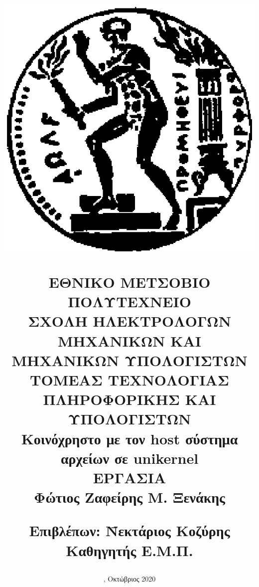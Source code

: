 \documentclass[12pt, a4paper, notitlepage]{report}
\newcommand{\en}[1]{\foreignlanguage{english}{#1}}
\newcommand{\host}{\en{host}}
\begin{document}
\title{
	\vspace*{-8ex}
	\begin{center}
		\includegraphics[scale=0.4]{pyrforos.eps}
	\end{center}
	\Large{Ε}\large{ΘΝΙΚΟ}
	\Large{Μ}\large{ΕΤΣΟΒΙΟ}
	\Large{Π}\large{ΟΛΥΤΕΧΝΕΙΟ} \\
	\normalsize{Σ}\small{ΧΟΛΗ}
	\normalsize{Η}\small{ΛΕΚΤΡΟΛΟΓΩΝ}
	\normalsize{Μ}\small{ΗΧΑΝΙΚΩΝ}
	\normalsize{Κ}\small{ΑΙ}
	\normalsize{Μ}\small{ΗΧΑΝΙΚΩΝ}
	\normalsize{Υ}\small{ΠΟΛΟΓΙΣΤΩΝ} \\
	\vspace{2ex}
	\normalsize{Τ}\small{ΟΜΕΑΣ}
	\normalsize{Τ}\small{ΕΧΝΟΛΟΓΙΑΣ}
	\normalsize{Π}\small{ΛΗΡΟΦΟΡΙΚΗΣ}
	\normalsize{Κ}\small{ΑΙ}
	\normalsize{Υ}\small{ΠΟΛΟΓΙΣΤΩΝ} \\
	\vspace{14ex}
	\large\textbf{Κοινόχρηστο με τον \host{} σύστημα αρχείων σε \en{unikernel}} \\
	\vspace{14ex}
	 ΕΡΓΑΣΙΑ \\
	\vspace{1ex}
	\center\textbf{Φώτιος Ζαφείρης Μ. Ξενάκης}
	\vfill
	\begin{tabbing}
		\normalsize
		\textbf{Επιβλέπων}: \= Νεκτάριος Κοζύρης \\
							\> Καθηγητής Ε.Μ.Π.
	\end{tabbing}
}
\author{}	%
\date{
	, Οκτώβριος 2020
}
\maketitle
\thispagestyle{empty}
\end{document}
